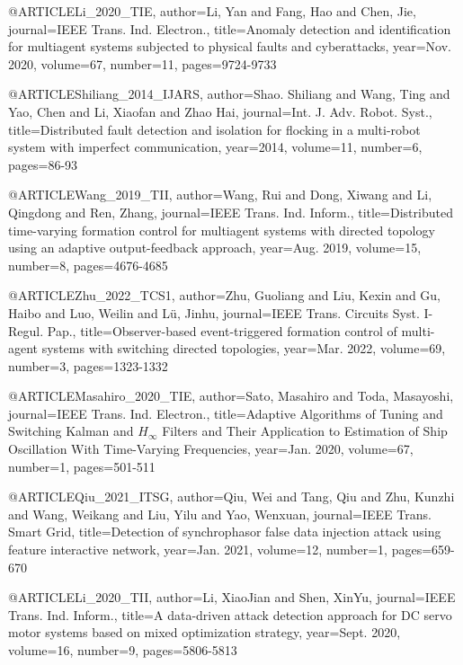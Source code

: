 @ARTICLE{Li_2020_TIE,
  author={Li, Yan and Fang, Hao and Chen, Jie},
  journal={IEEE Trans. Ind. Electron.}, 
  title={Anomaly detection and identification for multiagent systems subjected to physical faults and cyberattacks}, 
  year={Nov. 2020},
  volume={67},
  number={11},
  pages={9724-9733}}
  
@ARTICLE{Shiliang_2014_IJARS,
  author={Shao. Shiliang and Wang, Ting and Yao, Chen and Li, Xiaofan and Zhao Hai},
  journal={Int. J. Adv. Robot. Syst.}, 
  title={Distributed fault detection and isolation for flocking in a multi-robot system with imperfect communication}, 
  year={2014},
  volume={11},
  number={6},
  pages={86-93}}

@ARTICLE{Wang_2019_TII,
  author={Wang, Rui and Dong, Xiwang and Li, Qingdong and Ren, Zhang},
  journal={IEEE Trans. Ind. Inform.}, 
  title={Distributed time-varying formation control for multiagent systems with directed topology using an adaptive output-feedback approach}, 
  year={Aug. 2019},
  volume={15},
  number={8},
  pages={4676-4685}}
  
@ARTICLE{Zhu_2022_TCS1,
author={Zhu, Guoliang and Liu, Kexin and Gu, Haibo and Luo, Weilin and Lü, Jinhu},
  journal={IEEE Trans. Circuits Syst. I-Regul. Pap.}, 
  title={Observer-based event-triggered formation control of multi-agent systems with switching directed topologies}, 
  year={Mar. 2022},
  volume={69},
  number={3},
  pages={1323-1332}}

@ARTICLE{Masahiro_2020_TIE,
  author={Sato, Masahiro and Toda, Masayoshi},
  journal={IEEE Trans. Ind. Electron.}, 
  title={Adaptive Algorithms of Tuning and Switching Kalman and $ {H}_{\infty }$ Filters and Their Application to Estimation of Ship Oscillation With Time-Varying Frequencies}, 
  year={Jan. 2020},
  volume={67},
  number={1},
  pages={501-511}}
  


@ARTICLE{Qiu_2021_ITSG,
  author={Qiu, Wei and Tang, Qiu and Zhu, Kunzhi and Wang, Weikang and Liu, Yilu and Yao, Wenxuan},
  journal={IEEE Trans. Smart Grid}, 
  title={Detection of synchrophasor false data injection attack using feature interactive network}, 
  year={Jan. 2021},
  volume={12},
  number={1},
  pages={659-670}}
  
@ARTICLE{Li_2020_TII,
  author={Li, XiaoJian and Shen, XinYu},
  journal={IEEE Trans. Ind. Inform.},
  title={A data-driven attack detection approach for DC servo motor systems based on mixed optimization strategy},
  year={Sept. 2020},
  volume={16},
  number={9},
  pages={5806-5813}}
  
